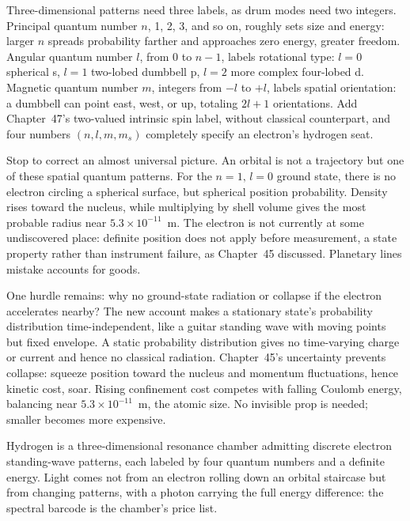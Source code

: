 Three-dimensional patterns need three labels, as drum modes need two integers. Principal quantum number \(n\), 1, 2, 3, and so on, roughly sets size and energy: larger \(n\) spreads probability farther and approaches zero energy, greater freedom. Angular quantum number \(l\), from 0 to \(n-1\), labels rotational type: \(l=0\) spherical s, \(l=1\) two-lobed dumbbell p, \(l=2\) more complex four-lobed d. Magnetic quantum number \(m\), integers from \(-l\) to \(+l\), labels spatial orientation: a dumbbell can point east, west, or up, totaling \(2l+1\) orientations. Add Chapter~47's two-valued intrinsic spin label, without classical counterpart, and four numbers \((n,l,m,m_s)\) completely specify an electron's hydrogen seat.

Stop to correct an almost universal picture. An orbital is not a trajectory but one of these spatial quantum patterns. For the \(n=1,\,l=0\) ground state, there is no electron circling a spherical surface, but spherical position probability. Density rises toward the nucleus, while multiplying by shell volume gives the most probable radius near \(5.3\times10^{-11}\)~m. The electron is not currently at some undiscovered place: definite position does not apply before measurement, a state property rather than instrument failure, as Chapter~45 discussed. Planetary lines mistake accounts for goods.

One hurdle remains: why no ground-state radiation or collapse if the electron accelerates nearby? The new account makes a stationary state's probability distribution time-independent, like a guitar standing wave with moving points but fixed envelope. A static probability distribution gives no time-varying charge or current and hence no classical radiation. Chapter~45's uncertainty prevents collapse: squeeze position toward the nucleus and momentum fluctuations, hence kinetic cost, soar. Rising confinement cost competes with falling Coulomb energy, balancing near \(5.3\times10^{-11}\)~m, the atomic size. No invisible prop is needed; smaller becomes more expensive.

\begin{oneline}
Hydrogen is a three-dimensional resonance chamber admitting discrete electron standing-wave patterns, each labeled by four quantum numbers and a definite energy. Light comes not from an electron rolling down an orbital staircase but from changing patterns, with a photon carrying the full energy difference: the spectral barcode is the chamber's price list.
\end{oneline}


